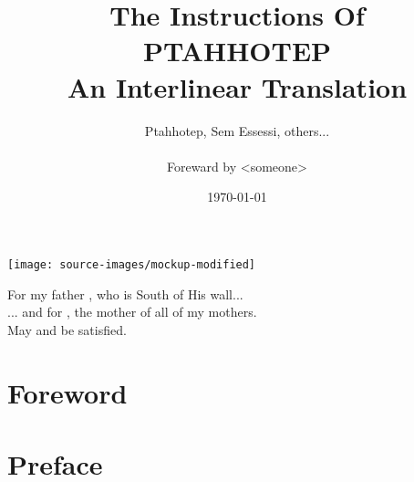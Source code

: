 \documentclass[a4paper,pagesize,8pt,pointlessnumbers,normalheadings]{book}
\title{
	\Large The Instructions Of\\
	\Huge \textbf{PTAHHOTEP}\\
	\vspace{2mm}
	\normalsize An Interlinear Translation}
\author{Ptahhotep, Sem Essessi, others...\\\\Foreward by <someone>}
\date{\today}
\begin{document}
\maketitle

\clearpage
\vspace*{\fill}
\clearpage

\vspace*{\fill}
\begin{center}
\texttt{[image: source-images/mockup-modified]}
\end{center}
\vspace*{\fill}
\pagebreak

\clearpage
\vspace*{\fill}
\clearpage

\vspace*{\fill}
\begin{center}
For my father , who is South of His wall...\\
\vspace{7.5mm}
... and for , the mother of all of my mothers.\\
\vspace{15mm}
May  and  be satisfied.\\
\end{center}
\vspace*{\fill}

\tableofcontents

\markboth{}{}

\newlength\q
\setlength{}

\chapter*{Foreword}

\markboth{}{}

\chapter*{Preface}

\markboth{}{}
\end{document}

